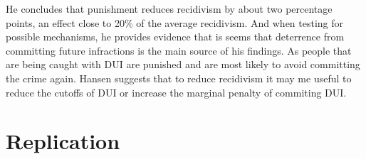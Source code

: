 \documentclass[11pt, letterpaper]{article}
\begin{document}
\begin{enumerate}
	He concludes that punishment reduces recidivism by about two percentage points, an effect close to 20\% of the average recidivism. And when testing for possible mechanisms, he provides evidence that is seems that deterrence from committing future infractions is the main source of his findings. As people that are being caught with DUI are punished and are most likely to avoid committing the crime again. Hansen suggests that to reduce recidivism it may me useful to reduce the cutoffs of DUI or increase the marginal penalty of commiting DUI. \\

\end{enumerate}


\section*{Replication}
\end{document}
